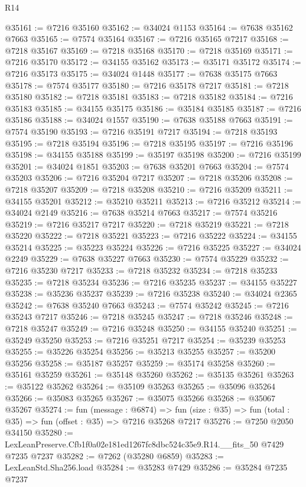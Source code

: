 \begin{lexlean}{R14}
\begin{coremodule}
@35161 := @7216 @35160
@35162 := @34024 @1153
@35164 := @7638 @35162 @7663
@35165 := @7574 @35164
@35167 := @7216 @35165 @7217
@35168 := @7218 @35167
@35169 := @7218 @35168
@35170 := @7218 @35169
@35171 := @7216 @35170
@35172 := @34155 @35162
@35173 := @35171 @35172
@35174 := @7216 @35173
@35175 := @34024 @1448
@35177 := @7638 @35175 @7663
@35178 := @7574 @35177
@35180 := @7216 @35178 @7217
@35181 := @7218 @35180
@35182 := @7218 @35181
@35183 := @7218 @35182
@35184 := @7216 @35183
@35185 := @34155 @35175
@35186 := @35184 @35185
@35187 := @7216 @35186
@35188 := @34024 @1557
@35190 := @7638 @35188 @7663
@35191 := @7574 @35190
@35193 := @7216 @35191 @7217
@35194 := @7218 @35193
@35195 := @7218 @35194
@35196 := @7218 @35195
@35197 := @7216 @35196
@35198 := @34155 @35188
@35199 := @35197 @35198
@35200 := @7216 @35199
@35201 := @34024 @1851
@35203 := @7638 @35201 @7663
@35204 := @7574 @35203
@35206 := @7216 @35204 @7217
@35207 := @7218 @35206
@35208 := @7218 @35207
@35209 := @7218 @35208
@35210 := @7216 @35209
@35211 := @34155 @35201
@35212 := @35210 @35211
@35213 := @7216 @35212
@35214 := @34024 @2149
@35216 := @7638 @35214 @7663
@35217 := @7574 @35216
@35219 := @7216 @35217 @7217
@35220 := @7218 @35219
@35221 := @7218 @35220
@35222 := @7218 @35221
@35223 := @7216 @35222
@35224 := @34155 @35214
@35225 := @35223 @35224
@35226 := @7216 @35225
@35227 := @34024 @2249
@35229 := @7638 @35227 @7663
@35230 := @7574 @35229
@35232 := @7216 @35230 @7217
@35233 := @7218 @35232
@35234 := @7218 @35233
@35235 := @7218 @35234
@35236 := @7216 @35235
@35237 := @34155 @35227
@35238 := @35236 @35237
@35239 := @7216 @35238
@35240 := @34024 @2365
@35242 := @7638 @35240 @7663
@35243 := @7574 @35242
@35245 := @7216 @35243 @7217
@35246 := @7218 @35245
@35247 := @7218 @35246
@35248 := @7218 @35247
@35249 := @7216 @35248
@35250 := @34155 @35240
@35251 := @35249 @35250
@35253 := @7216 @35251 @7217
@35254 := @35239 @35253
@35255 := @35226 @35254
@35256 := @35213 @35255
@35257 := @35200 @35256
@35258 := @35187 @35257
@35259 := @35174 @35258
@35260 := @35161 @35259
@35261 := @35148 @35260
@35262 := @35135 @35261
@35263 := @35122 @35262
@35264 := @35109 @35263
@35265 := @35096 @35264
@35266 := @35083 @35265
@35267 := @35075 @35266
@35268 := @35067 @35267
@35274 := fun (message : @6874) =>
  fun (size : @35) => fun (total : @35) => fun (offset : @35) => @7216 @35268 @7217
@35276 := @7250 @2050 @34150
@35280 := LexLeanPreserve.Cfb1f0a02e181ed1267fc8dbc524c35e9.R14.__fits_50 @7429 @7235 @7237
@35282 := @7262 (@35280 @6859)
@35283 := LexLeanStd.Sha256.load
@35284 := @35283 @7429
@35286 := @35284 @7235 @7237

\end{coremodule}
\end{lexlean}
